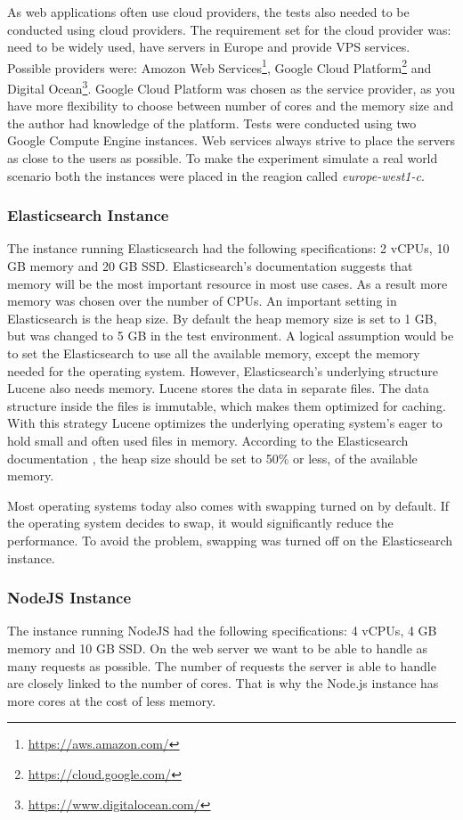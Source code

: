 As web applications often use cloud providers, the tests also needed to be conducted using cloud providers.
The requirement set for the cloud provider was: need to be widely used, have servers in Europe and provide VPS services.
Possible providers were: Amozon Web Services\footnote{\url{https://aws.amazon.com/}},
Google Cloud Platform\footnote{\url{https://cloud.google.com/}} and Digital Ocean\footnote{\url{https://www.digitalocean.com/}}.
Google Cloud Platform was chosen as the service provider, as you have more flexibility to choose between number of cores and the memory size and
the author had knowledge of the platform.
Tests were conducted using two Google Compute Engine instances.
Web services always strive to place the servers as close to the users as possible.
To make the experiment simulate a real world scenario both the instances were placed in the reagion called \textit{europe-west1-c}.

\subsubsection{Elasticsearch Instance}
The instance running Elasticsearch had the following specifications: 2 vCPUs, 10 GB memory and 20 GB SSD.
Elasticsearch's documentation \cite{elasticsearch-hardware}
suggests that memory will be the most important resource in most use cases.
As a result more memory was chosen over the number of CPUs.
An important setting in Elasticsearch is the heap size.
By default the heap memory size is set to 1 GB,
but was changed to 5 GB in the test environment.
A logical assumption would be to set the Elasticsearch to use all the available memory, except the memory needed for the operating system.
However, Elasticsearch's underlying structure Lucene also needs memory.
Lucene stores the data in separate files.
The data structure inside the files is immutable, which makes them optimized for caching.
With this strategy Lucene optimizes the underlying operating system's eager to hold small and often used files in memory.
According to the Elasticsearch documentation \cite{elasticsearch-heap-size},
the heap size should be set to 50\% or less, of the available memory.

Most operating systems today also comes with swapping turned on by default.
If the operating system decides to swap, it would significantly reduce the performance.
To avoid the problem, swapping was turned off on the Elasticsearch instance.

\subsubsection{NodeJS Instance}
The instance running NodeJS had the following specifications: 4 vCPUs, 4 GB memory and 10 GB SSD.
On the web server we want to be able to handle as many requests as possible.
The number of requests the server is able to handle are closely linked to the number of cores.
That is why the Node.js instance has more cores at the cost of less memory.

